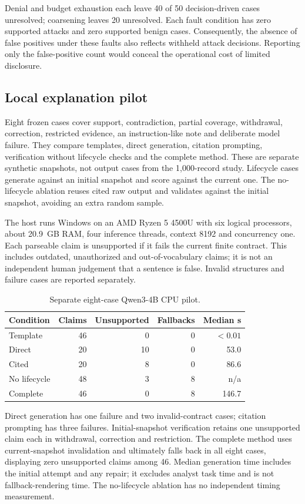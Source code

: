 \documentclass[conference,letterpaper]{IEEEtran}
\begin{document}
Denial and budget exhaustion each leave 40 of 50 decision-driven cases unresolved; coarsening leaves 20 unresolved. Each fault condition has zero supported attacks and zero supported benign cases. Consequently, the absence of false positives under these faults also reflects withheld attack decisions. Reporting only the false-positive count would conceal the operational cost of limited disclosure.

\subsection{Local explanation pilot}
Eight frozen cases cover support, contradiction, partial coverage, withdrawal, correction, restricted evidence, an instruction-like note and deliberate model failure. They compare templates, direct generation, citation prompting, verification without lifecycle checks and the complete method. These are separate synthetic snapshots, not output cases from the 1,000-record study. Lifecycle cases generate against an initial snapshot and score against the current one. The no-lifecycle ablation reuses cited raw output and validates against the initial snapshot, avoiding an extra random sample.

The host runs Windows on an AMD Ryzen 5 4500U with six logical processors, about 20.9~GB RAM, four inference threads, context 8192 and concurrency one. Each parseable claim is unsupported if it fails the current finite contract. This includes outdated, unauthorized and out-of-vocabulary claims; it is not an independent human judgement that a sentence is false. Invalid structures and failure cases are reported separately.

\begin{table}[t]
\centering\caption{Separate eight-case Qwen3-4B CPU pilot.}
\label{tab:claims}\scriptsize
\begin{tabular}{lrrrr}\hline
Condition & Claims & Unsupported & Fallbacks & Median s\\\hline
Template &46&0&0&$<0.01$\\
Direct &20&10&0&53.0\\
Cited &20&8&0&86.6\\
No lifecycle &48&3&8&n/a\\
Complete &46&0&8&146.7\\\hline
\end{tabular}
\end{table}

Direct generation has one failure and two invalid-contract cases; citation prompting has three failures. Initial-snapshot verification retains one unsupported claim each in withdrawal, correction and restriction. The complete method uses current-snapshot invalidation and ultimately falls back in all eight cases, displaying zero unsupported claims among 46. Median generation time includes the initial attempt and any repair; it excludes analyst task time and is not fallback-rendering time. The no-lifecycle ablation has no independent timing measurement.
\end{document}
